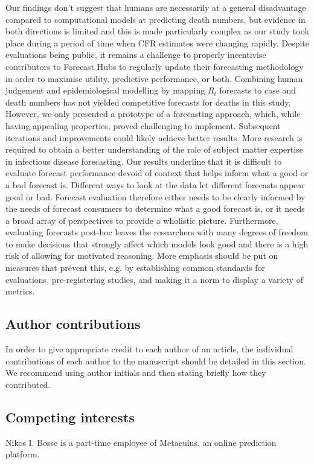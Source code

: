 \documentclass[10pt,a4paper,twocolumn]{article}
\begin{document}
Our findings don't suggest that humans are necessarily at a general disadvantage compared to computational models at predicting death numbers, but evidence in both directions is limited and this is made particularly complex as our study took place during a period of time when CFR estimates were changing rapidly. Despite evaluations being public, it remains a challenge to properly incentivise contributors to Forecast Hubs to regularly update their forecasting methodology in order to maximise utility, predictive performance, or both. Combining human judgement and epidemiological modelling by mapping $R_t$ forecasts to case and death numbers has not yielded competitive forecasts for deaths in this study. However, we only presented a prototype of a forecasting approach, which, while having appealing properties, proved challenging to implement. Subsequent iterations and improvements could likely achieve better results. More research is required to obtain a better understanding of the role of subject matter expertise in infectious disease forecasting. Our results underline that it is difficult to evaluate forecast performance devoid of context that helps inform what a good or a bad forecast is. Different ways to look at the data let different forecasts appear good or bad. Forecast evaluation therefore either needs to be clearly informed by the needs of forecast consumers to determine what a good forecast is, or it needs a broad array of perspectives to provide a wholistic picture. Furthermore, evaluating forecasts post-hoc leaves the researchers with many degrees of freedom to make decisions that strongly affect which models look good and there is a high risk of allowing for motivated reasoning. More emphasis should be put on measures that prevent this, e.g. by establishing common standards for evaluations, pre-registering studies, and making it a norm to display a variety of metrics. 








\subsection*{Author contributions}
In order to give appropriate credit to each author of an article, the individual
contributions of each author to the manuscript should be detailed in this section. We
recommend using author initials and then stating briefly how they contributed.

\subsection*{Competing interests}
Nikos I. Bosse is a part-time employee of Metaculus, an online prediction platform. 
\end{document}
